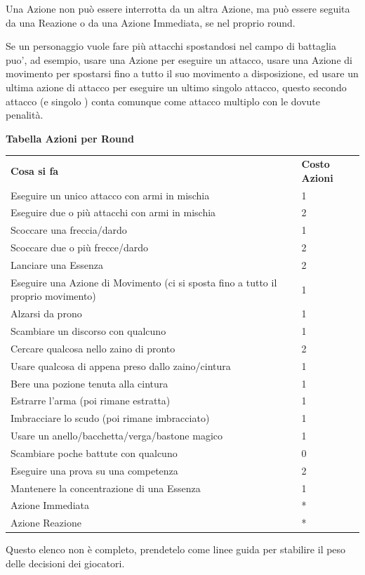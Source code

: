 \documentclass[a4paper,11pt,twoside,openany]{book}
\begin{document}
Una Azione non può essere interrotta da un altra Azione, ma può essere seguita da una Reazione o da una Azione Immediata, se nel proprio round.

Se un personaggio vuole fare più attacchi spostandosi nel campo di battaglia puo', ad esempio, usare una Azione per eseguire un attacco, usare una Azione di movimento per spostarsi fino a tutto il suo movimento a disposizione, ed usare un ultima azione di attacco per eseguire un ultimo singolo attacco, questo secondo attacco (e singolo ) conta comunque come attacco multiplo con le dovute penalità.

\medskip

\textbf{Tabella Azioni per Round}

\medskip

\begin{tabular}{ll}
	\toprule
	\textbf{Cosa si fa}                                & \textbf{Costo Azioni}\tabularnewline
	Eseguire un unico attacco con armi in mischia      & 1\tabularnewline
	Eseguire due o più attacchi con armi in mischia    & 2\tabularnewline
	Scoccare una freccia/dardo                         & 1\tabularnewline
	Scoccare due o più frecce/dardo                    & 2\tabularnewline
	Lanciare una Essenza                               & 2\tabularnewline
	Eseguire una Azione di Movimento (ci si sposta fino a tutto
	il proprio movimento)                              & 1\tabularnewline
	Alzarsi da prono                                   & 1 \tabularnewline
	Scambiare un discorso con qualcuno                 & 1\tabularnewline
	Cercare qualcosa nello zaino di pronto             & 2\tabularnewline
	Usare qualcosa di appena preso dallo zaino/cintura & 1\tabularnewline
	Bere una pozione tenuta alla cintura               & 1\tabularnewline
	Estrarre l'arma (poi rimane estratta)              & 1\tabularnewline
	Imbracciare lo scudo (poi rimane imbracciato)      & 1\tabularnewline
	Usare un anello/bacchetta/verga/bastone magico     & 1\tabularnewline
	Scambiare poche battute con qualcuno               & 0\tabularnewline
	Eseguire una prova su una competenza               & 2\tabularnewline
	Mantenere la concentrazione di una Essenza         & 1\tabularnewline
	Azione Immediata                                   & {*}\tabularnewline
	Azione Reazione                                    & {*}\tabularnewline
\end{tabular}

\smallskip

Questo elenco non è completo, prendetelo come linee guida per stabilire il peso delle decisioni dei giocatori.
\end{document}
